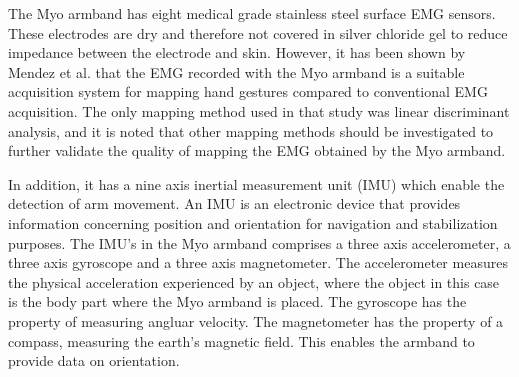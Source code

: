 The Myo armband has eight medical grade stainless steel surface EMG sensors. %
These electrodes are dry and therefore not covered in silver chloride gel to reduce impedance between the electrode and skin. However, it has been shown by Mendez et al. \cite{Mendez2017} that the EMG recorded with the Myo armband is a suitable acquisition system for mapping hand gestures compared to conventional EMG acquisition. The only mapping method used in that study was linear discriminant analysis, and it is noted that other mapping methods should be investigated to further validate the quality of mapping the EMG obtained by the Myo armband. 

In addition, it has a nine axis inertial measurement unit (IMU) which enable the detection of arm movement. An IMU is an electronic device that provides information concerning position and orientation for navigation and stabilization purposes. The IMU's in the Myo armband comprises a three axis accelerometer, a three axis gyroscope and a three axis magnetometer. The accelerometer measures the physical acceleration experienced by an object, where the object in this case is the body part where the Myo armband is placed. 
The gyroscope has the property of measuring angluar velocity. The magnetometer has the property of a compass, measuring the earth's magnetic field. This enables the armband to provide data on orientation. 


